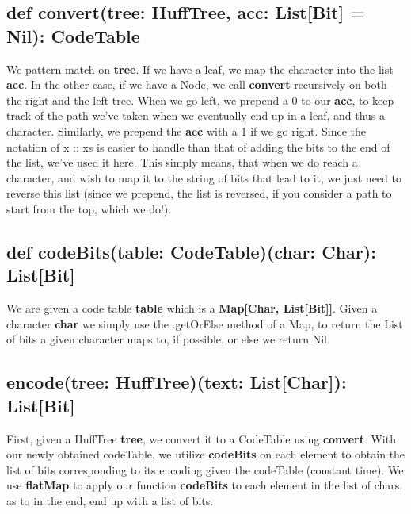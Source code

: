 \documentclass{article}
\begin{document}
\subsection{def convert(tree: HuffTree, acc: List[Bit] = Nil): CodeTable }
We pattern match on \textbf{tree}. If we have a leaf, we map the character into the list \textbf{acc}. In the other case, if we have a Node, we call \textbf{convert} recursively on both the right and the left tree. When we go left, we prepend a 0 to our \textbf{acc}, to keep track of the path we've taken when we eventually end up in a leaf, and thus a character. Similarly, we prepend the \textbf{acc} with a 1 if we go right. Since the notation of x :: xs is easier to handle than that of adding the bits to the end of the list, we've used it here. This simply means, that when we do reach a character, and wish to map it to the string of bits that lead to it, we just need to reverse this list (since we prepend, the list is reversed, if you consider a path to start from the top, which we do!). 

\subsection{def codeBits(table: CodeTable)(char: Char): List[Bit]}
We are given a code table \textbf{table} which is a \textbf{Map[Char, List[Bit]]}. Given a character \textbf{char} we simply use the .getOrElse method of a Map, to return the List of bits a given character maps to, if possible, or else we return Nil.


\subsection{encode(tree: HuffTree)(text: List[Char]): List[Bit]}
First, given a HuffTree \textbf{tree}, we convert it to a CodeTable using \textbf{convert}. With our newly obtained codeTable, we utilize \textbf{codeBits} on each element to obtain the list of bits corresponding to its encoding given the codeTable (constant time). We use \textbf{flatMap} to apply our function \textbf{codeBits} to each element in the list of chars, as to in the end, end up with a list of bits. 

\end{document}
